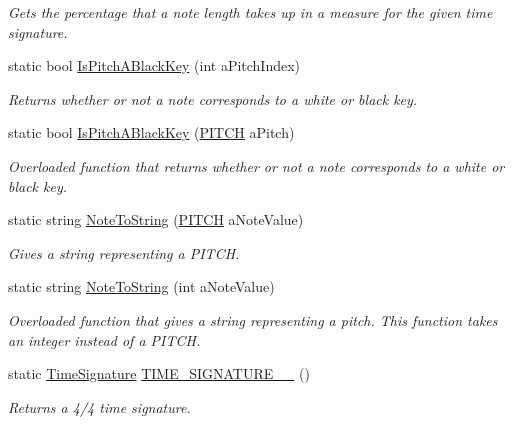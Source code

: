 \begin{DoxyCompactItemize}
\begin{DoxyCompactList}\small\item\em Gets the percentage that a note length takes up in a measure for the given time signature. \end{DoxyCompactList}\item 
static bool \hyperlink{group___music_stat_func_gacc2c1a66df7197225f61c5737f794065}{Is\+Pitch\+A\+Black\+Key} (int a\+Pitch\+Index)
\begin{DoxyCompactList}\small\item\em Returns whether or not a note corresponds to a white or black key. \end{DoxyCompactList}\item 
static bool \hyperlink{group___music_stat_func_ga4c91d4a78702a5c16e833af6585b9e19}{Is\+Pitch\+A\+Black\+Key} (\hyperlink{group___music_enums_ga508f69b199ea518f935486c990edac1d}{P\+I\+T\+CH} a\+Pitch)
\begin{DoxyCompactList}\small\item\em Overloaded function that returns whether or not a note corresponds to a white or black key. \end{DoxyCompactList}\item 
static string \hyperlink{group___music_stat_func_ga85a22c905d56d4c5f4e62159bfecee8c}{Note\+To\+String} (\hyperlink{group___music_enums_ga508f69b199ea518f935486c990edac1d}{P\+I\+T\+CH} a\+Note\+Value)
\begin{DoxyCompactList}\small\item\em Gives a string representing a P\+I\+T\+CH. \end{DoxyCompactList}\item 
static string \hyperlink{group___music_stat_func_ga03f793951dcfe199532c9596cb539022}{Note\+To\+String} (int a\+Note\+Value)
\begin{DoxyCompactList}\small\item\em Overloaded function that gives a string representing a pitch. This function takes an integer instead of a P\+I\+T\+CH. \end{DoxyCompactList}\item 
static \hyperlink{group___music_structs_struct_music_1_1_time_signature}{Time\+Signature} \hyperlink{group___music_stat_func_gac95af323eef7511543c799154e1c29fd}{T\+I\+M\+E\+\_\+\+S\+I\+G\+N\+A\+T\+U\+R\+E\+\_\+\_} ()
\begin{DoxyCompactList}\small\item\em Returns a 4/4 time signature. \end{DoxyCompactList}\item 

\end{DoxyCompactItemize}
